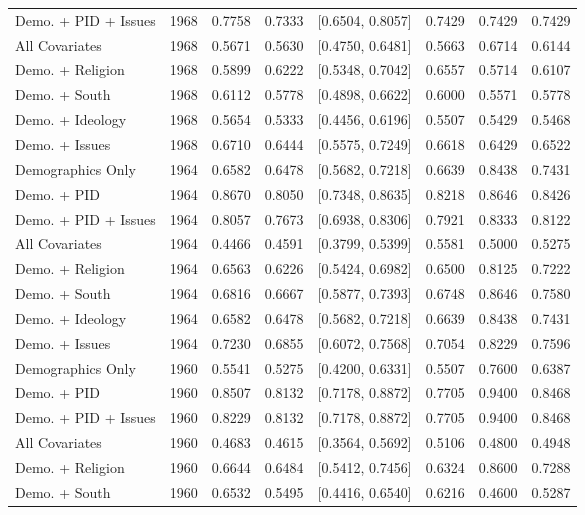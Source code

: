 \begin{longtable}{lrrrlrrr}
  Demo. + PID + Issues & 1968 & 0.7758 & 0.7333 & [0.6504, 0.8057] & 0.7429 & 0.7429 & 0.7429 \\ 
  All Covariates & 1968 & 0.5671 & 0.5630 & [0.4750, 0.6481] & 0.5663 & 0.6714 & 0.6144 \\ 
  Demo. + Religion & 1968 & 0.5899 & 0.6222 & [0.5348, 0.7042] & 0.6557 & 0.5714 & 0.6107 \\ 
  Demo. + South & 1968 & 0.6112 & 0.5778 & [0.4898, 0.6622] & 0.6000 & 0.5571 & 0.5778 \\ 
  Demo. + Ideology & 1968 & 0.5654 & 0.5333 & [0.4456, 0.6196] & 0.5507 & 0.5429 & 0.5468 \\ 
  Demo. + Issues & 1968 & 0.6710 & 0.6444 & [0.5575, 0.7249] & 0.6618 & 0.6429 & 0.6522 \\ 
  Demographics Only & 1964 & 0.6582 & 0.6478 & [0.5682, 0.7218] & 0.6639 & 0.8438 & 0.7431 \\ 
  Demo. + PID & 1964 & 0.8670 & 0.8050 & [0.7348, 0.8635] & 0.8218 & 0.8646 & 0.8426 \\ 
  Demo. + PID + Issues & 1964 & 0.8057 & 0.7673 & [0.6938, 0.8306] & 0.7921 & 0.8333 & 0.8122 \\ 
  All Covariates & 1964 & 0.4466 & 0.4591 & [0.3799, 0.5399] & 0.5581 & 0.5000 & 0.5275 \\ 
  Demo. + Religion & 1964 & 0.6563 & 0.6226 & [0.5424, 0.6982] & 0.6500 & 0.8125 & 0.7222 \\ 
  Demo. + South & 1964 & 0.6816 & 0.6667 & [0.5877, 0.7393] & 0.6748 & 0.8646 & 0.7580 \\ 
  Demo. + Ideology & 1964 & 0.6582 & 0.6478 & [0.5682, 0.7218] & 0.6639 & 0.8438 & 0.7431 \\ 
  Demo. + Issues & 1964 & 0.7230 & 0.6855 & [0.6072, 0.7568] & 0.7054 & 0.8229 & 0.7596 \\ 
  Demographics Only & 1960 & 0.5541 & 0.5275 & [0.4200, 0.6331] & 0.5507 & 0.7600 & 0.6387 \\ 
  Demo. + PID & 1960 & 0.8507 & 0.8132 & [0.7178, 0.8872] & 0.7705 & 0.9400 & 0.8468 \\ 
  Demo. + PID + Issues & 1960 & 0.8229 & 0.8132 & [0.7178, 0.8872] & 0.7705 & 0.9400 & 0.8468 \\ 
  All Covariates & 1960 & 0.4683 & 0.4615 & [0.3564, 0.5692] & 0.5106 & 0.4800 & 0.4948 \\ 
  Demo. + Religion & 1960 & 0.6644 & 0.6484 & [0.5412, 0.7456] & 0.6324 & 0.8600 & 0.7288 \\ 
  Demo. + South & 1960 & 0.6532 & 0.5495 & [0.4416, 0.6540] & 0.6216 & 0.4600 & 0.5287 \\ 

\end{longtable}
